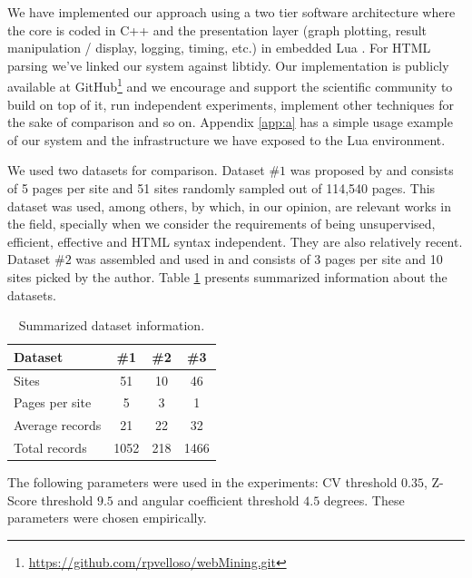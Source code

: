 \documentclass{vldb}
\begin{document}
We have implemented our approach using a two tier software architecture where
the core is coded in C++ and the presentation layer (graph plotting, result
manipulation / display, logging, timing, etc.) in embedded Lua \cite{luahome}.
For HTML parsing we've linked our system against libtidy\cite{libtidy}. Our
implementation is publicly available at
GitHub\footnote{\url{https://github.com/rpvelloso/webMining.git}} and we
encourage and support the scientific community to build on top of it, run
independent experiments, implement other techniques for the sake of comparison
and so on.
Appendix \ref{app:a} has a simple usage example of our system and the
infrastructure we have exposed to the Lua environment.

We used two datasets for comparison. Dataset $\#1$ was proposed by
\cite{yamada2004testbed} and consists of 5 pages per site and 51 sites
randomly sampled out of 114,540 pages. This dataset was used, among others, by
\cite{TPC09,grigalis2013towards} which, in our opinion, are relevant works in
the field, specially when we consider the requirements of being unsupervised,
efficient, effective and HTML syntax independent. They are also relatively
recent.
Dataset $\#2$ was assembled and used in \cite{grigalis2013towards} and consists
of 3 pages per site and 10 sites picked by the author.
Table \ref{table:dataset} presents summarized information about the datasets.

\begin{table}[h]
\centering
\caption{Summarized dataset information.}
\label{table:dataset}
\begin{tabular}
{|l| c| c| c|}\hline
Dataset	& \#1	& \#2 & \#3 \\ \hline
Sites &	51 & 10 & 46\\ \hline
Pages per site	& 5 & 3 & 1\\ \hline
Average records & 21 & 22 & 32 \\ \hline
Total records &	1052 & 218 & 1466 \\ \hline
\end{tabular}
\end{table}

The following parameters were used in the experiments: CV threshold $0.35$,
Z-Score threshold $9.5$ and angular coefficient threshold $4.5$ degrees. These
parameters were chosen empirically.
\end{document}
